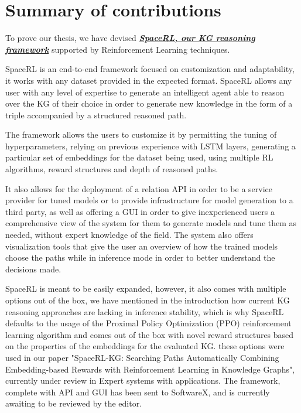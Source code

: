 \section{Summary of contributions}\label{sec:intro-summary}
To prove our thesis, we have devised \href{https://github.com/DEAL-US/SpaceRL-KG}{\textbf{\textit{SpaceRL, our KG reasoning framework}}} supported by Reinforcement Learning techniques.

SpaceRL is an end-to-end framework focused on customization and adaptability, it works with any dataset provided in the expected format. SpaceRL allows any user with any level of expertise to generate an intelligent agent able to reason over the KG of their choice in order to generate new knowledge in the form of a triple accompanied by a structured reasoned path.

The framework allows the users to customize it by permitting the tuning of hyperparameters, relying on previous experience with LSTM layers, generating a particular set of embeddings for the dataset being used, using multiple RL algorithms, reward structures and depth of reasoned paths.

It also allows for the deployment of a relation API in order to be a service provider for tuned models or to provide infrastructure for model generation to a third party, as well as offering a GUI in order to give inexperienced users a comprehensive view of the system for them to generate models and tune them as needed, without expert knowledge of the field. The system also offers visualization tools that give the user an overview of how the trained models choose the paths while in inference mode in order to better understand the decisions made.

SpaceRL is meant to be easily expanded, however, it also comes with multiple options out of the box, we have mentioned in the introduction how current KG reasoning approaches are lacking in inference stability, which is why SpaceRL defaults to the usage of the Proximal Policy Optimization (PPO) reinforcement learning algorithm and comes out of the box with novel reward structures based on the properties of the embeddings for the evaluated KG. these options were used in our paper "SpaceRL-KG: Searching Paths Automatically Combining Embedding-based Rewards with Reinforcement Learning in Knowledge Graphs", currently under review in Expert systems with applications. The framework, complete with API and GUI has been sent to SoftwareX, and is currently awaiting to be reviewed by the editor.

